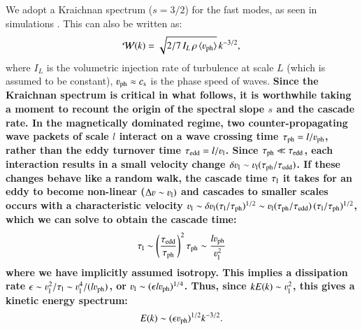 \documentclass[fleqn,usenatbib,useAMS]{mnras}
\newcommand\C[1]{{\bf #1}}
\newcommand{\Vph}{\varv_\mathrm{ph}}
\begin{document}
We adopt a Kraichnan spectrum ($s=3/2$) for the fast modes, as seen in simulations \citep{cho03}. This can also be written as: 
\begin{equation}
  \label{eq:Wk}
  \mathcal{W}(k) =
\sqrt{2/7\,I_L\,\rho\,\langle \Vph \rangle}\,k^{-3/2},
\end{equation}
where $I_L$ is the volumetric injection rate of turbulence at scale $L$ (which
is assumed to be constant), $\varv_{\rm ph}\approx c_{\rm s}$ is the phase speed
of waves. \C{Since the Kraichnan spectrum is critical in what follows, it is
  worthwhile taking a moment to recount the origin of the spectral slope $s$ and
  the cascade rate. In the magnetically dominated regime, two counter-propagating
  wave packets of scale $l$ interact on a wave crossing time $\tau_{\rm
    ph}=l/\varv_{\rm ph}$, rather than the eddy turnover time $\tau_{\rm edd} =
  l/\varv_{\rm l}$.  Since $\tau_{\rm ph} \ll \tau_{\rm edd}$, each interaction
  results in a small velocity change $\delta \varv_{\rm l} \sim \varv_{\rm l}
  (\tau_{\rm ph}/\tau_{\rm edd})$. If these changes behave like a random walk,
  the cascade time $\tau_{\rm l}$ it takes for an eddy to become non-linear
  ($\Delta \varv \sim \varv_{\rm l})$ and cascades to smaller scales occurs with
  a characteristic velocity $\varv_{\rm l} \sim \delta \varv_{\rm l} (\tau_{\rm
    l}/\tau_{\rm ph})^{1/2} \sim \varv_{\rm l} (\tau_{\rm ph}/\tau_{\rm edd})\,
  (\tau_{\rm l}/\tau_{\rm ph})^{1/2}$, which we can solve to obtain the cascade
  time:
\begin{equation}
  \label{eqn:tau_l}
\tau_{\rm l} \sim \left(\frac{\tau_{\rm edd}}{\tau_{\rm ph}}\right)^{2} \tau_{\rm ph} \sim \frac{l \varv_{\rm ph}}{\varv_{\rm l}^{2}} 
\end{equation}
where we have implicitly assumed isotropy. This implies a dissipation rate $\epsilon \sim \varv_{\rm l}^{2}/\tau_{\rm l} \sim \varv_{\rm l}^{4}/(l \varv_{\rm ph})$, or $\varv_{\rm l} \sim (\epsilon l \varv_{\rm ph})^{1/4}$. Thus, since $k E(k)\sim \varv_{\rm l}^{2}$, this gives a kinetic energy spectrum: 
\begin{equation}
E(k) \sim (\epsilon \varv_{\rm ph})^{1/2} k^{-3/2}.
\end{equation}}
 
\end{document}
